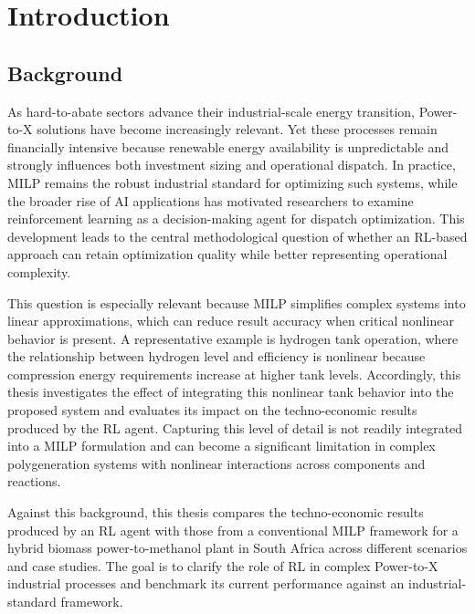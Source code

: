 ﻿%

\chapter{Introduction}
\label{ch:introduction}

\section{Background}

As hard-to-abate sectors advance their industrial-scale energy transition, Power-to-X solutions have become increasingly relevant. Yet these processes remain financially intensive because renewable energy availability is unpredictable and strongly influences both investment sizing and operational dispatch. In practice, MILP remains the robust industrial standard for optimizing such systems, while the broader rise of AI applications has motivated researchers to examine reinforcement learning as a decision-making agent for dispatch optimization. This development leads to the central methodological question of whether an RL-based approach can retain optimization quality while better representing operational complexity.

This question is especially relevant because MILP simplifies complex systems into linear approximations, which can reduce result accuracy when critical nonlinear behavior is present. A representative example is hydrogen tank operation, where the relationship between hydrogen level and efficiency is nonlinear because compression energy requirements increase at higher tank levels. Accordingly, this thesis investigates the effect of integrating this nonlinear tank behavior into the proposed system and evaluates its impact on the techno-economic results produced by the RL agent. Capturing this level of detail is not readily integrated into a MILP formulation and can become a significant limitation in complex polygeneration systems with nonlinear interactions across components and reactions.

Against this background, this thesis compares the techno-economic results produced by an RL agent with those from a conventional MILP framework for a hybrid biomass power-to-methanol plant in South Africa across different scenarios and case studies. The goal is to clarify the role of RL in complex Power-to-X industrial processes and benchmark its current performance against an industrial-standard framework.

